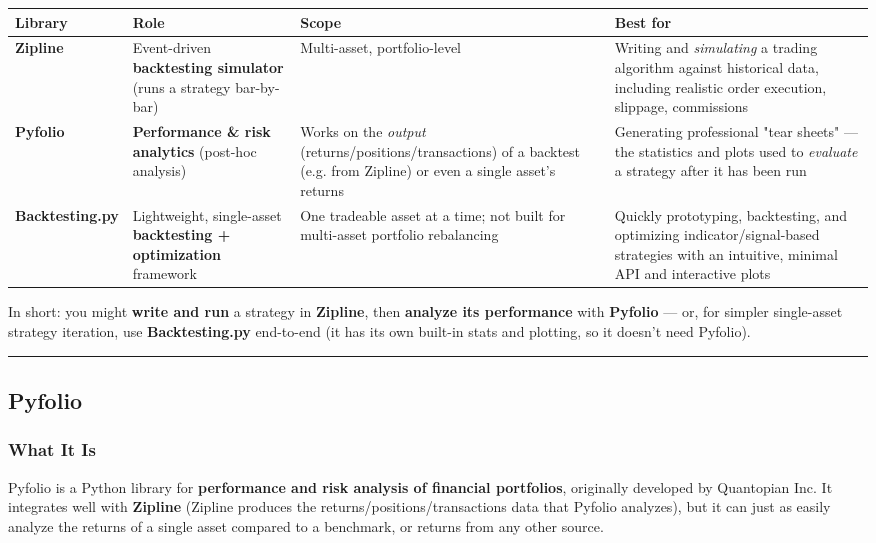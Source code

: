 \documentclass[12pt,openany]{book}
\theoremstyle{definition}
\theoremstyle{remark}
\begin{document}
\begin{longtable}{@{}L{0.22\textwidth}L{0.22\textwidth}L{0.22\textwidth}L{0.22\textwidth}@{}}
\toprule
\textbf{Library} & \textbf{Role} & \textbf{Scope} & \textbf{Best for} \\
\midrule
\textbf{Zipline} & Event-driven \textbf{backtesting simulator} (runs a strategy bar-by-bar) & Multi-asset, portfolio-level & Writing and \emph{simulating} a trading algorithm against historical data, including realistic order execution, slippage, commissions \\
\textbf{Pyfolio} & \textbf{Performance \& risk analytics} (post-hoc analysis) & Works on the \emph{output} (returns/\allowbreak positions/\allowbreak transactions) of a backtest (e.g. from Zipline) or even a single asset's returns & Generating professional "tear sheets" — the statistics and plots used to \emph{evaluate} a strategy after it has been run \\
\textbf{Backtesting.py} & Lightweight, single-asset \textbf{backtesting + optimization} framework & One tradeable asset at a time; not built for multi-asset portfolio rebalancing & Quickly prototyping, backtesting, and optimizing indicator/signal-based strategies with an intuitive, minimal API and interactive plots \\
\bottomrule
\end{longtable}

In short: you might \textbf{write and run} a strategy in \textbf{Zipline}, then \textbf{analyze its performance} with \textbf{Pyfolio} — or, for simpler single-asset strategy iteration, use \textbf{Backtesting.py} end-to-end (it has its own built-in stats and plotting, so it doesn't need Pyfolio).

\medskip
\hrule
\medskip
\subsection{Pyfolio}
\subsubsection{What It Is}

Pyfolio is a Python library for \textbf{performance and risk analysis of financial portfolios}, originally developed by Quantopian Inc. It integrates well with \textbf{Zipline} (Zipline produces the returns/positions/transactions data that Pyfolio analyzes), but it can just as easily analyze the returns of a single asset compared to a benchmark, or returns from any other source.
\end{document}
